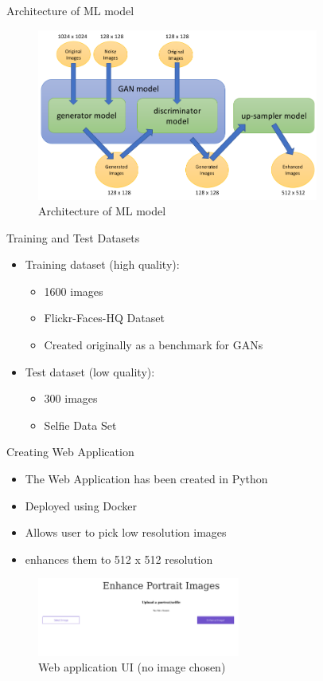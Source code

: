 \documentclass{beamer}
\begin{document}
	\begin{frame}{Architecture of ML model}
		\vspace{3mm}
		\begin{figure}[htbp]
			\centerline{\includegraphics[width=25em]{arch_srgan.png}}
			\caption{Architecture of ML model}
			\label{arch-fig}
		\end{figure}
	\end{frame}

	\begin{frame}{Training and Test Datasets}
		\begin{itemize}
			\item Training dataset (high quality):
			\begin{itemize}
				\item 1600 images
				\item Flickr-Faces-HQ Dataset
				\item Created originally as a benchmark for GANs 
			\end{itemize}
			\vspace{3mm}
			\item Test dataset (low quality):
			\begin{itemize}
				\item 300 images
				\item  Selfie Data Set
			\end{itemize}
		\end{itemize}
	\end{frame}

	\begin{frame}{Creating Web Application}
		\begin{itemize}
			\item The Web Application has been created in Python
			\item Deployed using Docker
			\item Allows user to pick low resolution images
			\item enhances them to 512 x 512 resolution
		\end{itemize}
		\vspace{3mm}
		\begin{figure}[htbp]
			\centerline{\includegraphics[width=18em]{webapp_ui1.png}}
			\caption{Web application UI (no image chosen)}
			\label{appui1-fig}
		\end{figure}
	\end{frame}
\end{document}
